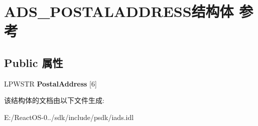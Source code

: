 \hypertarget{struct_a_d_s___p_o_s_t_a_l_a_d_d_r_e_s_s}{}\section{A\+D\+S\+\_\+\+P\+O\+S\+T\+A\+L\+A\+D\+D\+R\+E\+S\+S结构体 参考}
\label{struct_a_d_s___p_o_s_t_a_l_a_d_d_r_e_s_s}
\subsection*{Public 属性}
\begin{DoxyCompactItemize}
\item 
\mbox{\label{struct_a_d_s___p_o_s_t_a_l_a_d_d_r_e_s_s_a187d8b22f38b03e5d70a6e398795dfcc}} 
L\+P\+W\+S\+TR {\bfseries Postal\+Address} \mbox{[}6\mbox{]}
\end{DoxyCompactItemize}


该结构体的文档由以下文件生成\+:\begin{DoxyCompactItemize}
\item 
E\+:/\+React\+O\+S-\/0../sdk/include/psdk/iads.\+idl\end{DoxyCompactItemize}
